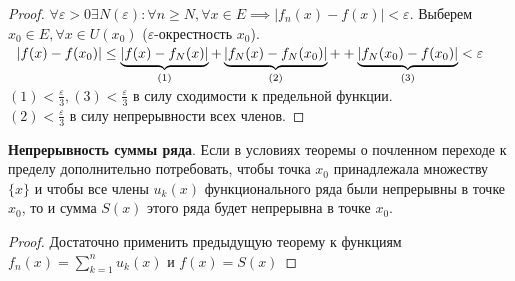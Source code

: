 \begin{proof}
$\forall \varepsilon > 0 \exists N(\varepsilon): \forall n \geq N, \forall x \in E \implies \left|f_n(x)-f(x)\right|< \varepsilon$.
Выберем $x_0 \in E, \forall x \in U(x_0)$ ($\varepsilon$-окрестность $x_0$).\\
\faEye \ $\left|f(x)-f(x_0)\right| \leq \displaystyle\underbrace{\left|f(x) - f_N(x)\right|}_{\text{(1)}}+\displaystyle\underbrace{\left|f_N(x) - f_N(x_0)\right|}_{\text{(2)}}+\\ +\displaystyle\underbrace{\left|f_N(x_0) - f(x_0)\right|}_{\text{(3)}} < \varepsilon$\\
$(1) < \frac{\varepsilon}{3}, (3) < \frac{\varepsilon}{3}$ в силу сходимости к предельной функции. \\
$(2) < \frac{\varepsilon}{3}$ в силу непрерывности всех членов.
\end{proof}

\bigbreak 
\textbf{Непрерывность суммы ряда}. Если в условиях теоремы о почленном переходе к пределу дополнительно потребовать, чтобы точка $x_0$ принадлежала множеству $\{x\}$ и чтобы все члены $u_k(x)$ функционального ряда были непрерывны в точке $x_0$, то и сумма $S(x)$ этого ряда будет непрерывна в точке $x_0$.

\begin{proof}
Достаточно применить предыдущую теорему к функциям $f_n(x)=\sum^{n}_{k=1}u_k(x)$ и $f(x) = S(x)$
\end{proof}

